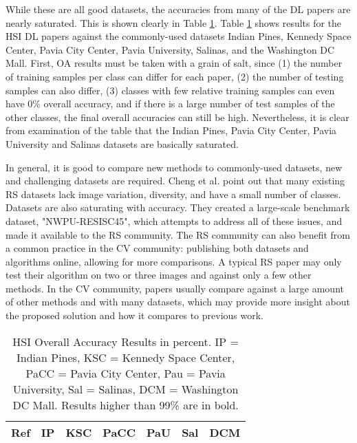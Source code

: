 \documentclass[12pt]{spieman}
\begin{document}
\begin{spacing}{1}
While these are all good datasets, the accuracies from many of the DL papers are nearly saturated. This is shown clearly in Table \ref{table:HSI_OA_Results}. Table \ref{table:HSI_OA_Results} shows results for the HSI DL papers against the commonly-used datasets Indian Pines, Kennedy Space Center, Pavia City Center, Pavia University, Salinas, and the Washington DC Mall. First, OA results must be taken with a grain of salt, since (1) the number of training samples per class can differ for each paper, (2) the number of testing samples can also differ, (3) classes with few relative training samples can even have 0\% overall accuracy, and if there is a large number of test samples of the other classes, the final overall accuracies can still be high. Nevertheless, it is clear from examination of the table that the Indian Pines, Pavia City Center, Pavia University and Salinas datasets are basically saturated. 

In general, it is good to compare new methods to commonly-used datasets, new and challenging datasets are required. Cheng et al. \cite{Cheng, Cheng2016} point out that many existing RS datasets lack image variation, diversity, and have a small number of classes. Datasets are also saturating with accuracy. They created a large-scale benchmark dataset, "NWPU-RESISC45", which attempts to address all of these issues, and made it available to the RS community. The RS community can also benefit from a common practice in the CV community: publishing both datasets and algorithms online, allowing for more comparisons. A typical RS paper may only test their algorithm on two or three images and against only a few other methods. In the CV community, papers usually compare against a large amount of other methods and with many datasets, which may provide more insight about the proposed solution and how it compares to previous work. 

\begin{table}[ht]
\centering

\caption{HSI Overall Accuracy Results in percent. IP = Indian Pines, KSC = Kennedy Space Center, PaCC = Pavia City Center, Pau = Pavia University, Sal = Salinas, DCM = Washington DC Mall. Results higher than 99\% are in bold.}
\label{table:HSI_OA_Results}
\begin{tabular}{|c|c|c|c|c|c|c|}
\hline

Ref     & IP & KSC & PaCC & PaU & Sal & DCM \\ \hline


\end{tabular}
\end{table}
\end{spacing}
\end{document}
